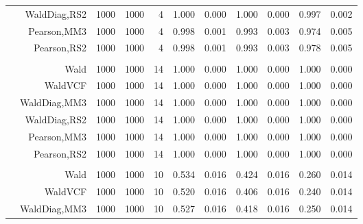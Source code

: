 \documentclass[
]{article}
\begin{document}
\begin{table}[H]
{\begin{tabular}[t]{lrrrrrrrlrr}
\hspace{1em} & WaldDiag,RS2 & 1000 & 1000 & 4 & 1.000 & 0.000 & 1.000 & 0.000 & 0.997 & 0.002\\

\hspace{1em} & Pearson,MM3 & 1000 & 1000 & 4 & 0.998 & 0.001 & 0.993 & 0.003 & 0.974 & 0.005\\

\hspace{1em} & Pearson,RS2 & 1000 & 1000 & 4 & 0.998 & 0.001 & 0.993 & 0.003 & 0.978 & 0.005\\
\cmidrule{1-11}
\addlinespace[0.3em]
\multicolumn{11}{l}{\textbf{1F 15V}}\\
\hspace{1em} & Wald & 1000 & 1000 & 14 & 1.000 & 0.000 & 1.000 & 0.000 & 1.000 & 0.000\\

\hspace{1em} & WaldVCF & 1000 & 1000 & 14 & 1.000 & 0.000 & 1.000 & 0.000 & 1.000 & 0.000\\

\hspace{1em} & WaldDiag,MM3 & 1000 & 1000 & 14 & 1.000 & 0.000 & 1.000 & 0.000 & 1.000 & 0.000\\

\hspace{1em} & WaldDiag,RS2 & 1000 & 1000 & 14 & 1.000 & 0.000 & 1.000 & 0.000 & 1.000 & 0.000\\

\hspace{1em} & Pearson,MM3 & 1000 & 1000 & 14 & 1.000 & 0.000 & 1.000 & 0.000 & 1.000 & 0.000\\

\hspace{1em} & Pearson,RS2 & 1000 & 1000 & 14 & 1.000 & 0.000 & 1.000 & 0.000 & 1.000 & 0.000\\
\cmidrule{1-11}
\addlinespace[0.3em]
\multicolumn{11}{l}{\textbf{2F 10V}}\\
\hspace{1em} & Wald & 1000 & 1000 & 10 & 0.534 & 0.016 & 0.424 & 0.016 & 0.260 & 0.014\\

\hspace{1em} & WaldVCF & 1000 & 1000 & 10 & 0.520 & 0.016 & 0.406 & 0.016 & 0.240 & 0.014\\

\hspace{1em} & WaldDiag,MM3 & 1000 & 1000 & 10 & 0.527 & 0.016 & 0.418 & 0.016 & 0.250 & 0.014\\


\end{tabular}}
\end{table}
\end{document}
